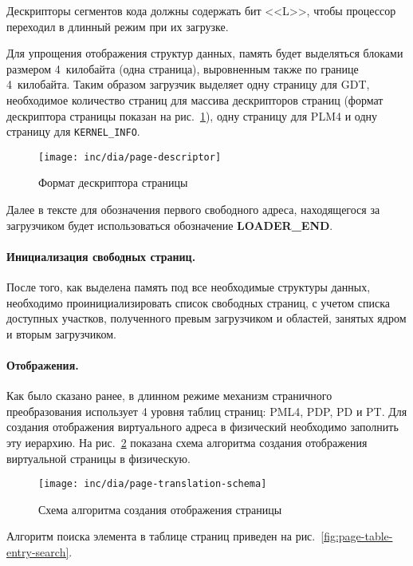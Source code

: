 Дескрипторы сегментов кода должны содержать бит <<L>>, чтобы процессор переходил в длинный
режим при их загрузке.

Для упрощения отображения структур данных, память будет выделяться блоками размером 4~килобайта (одна страница),
выровненным также по границе 4~килобайта. Таким образом загрузчик выделяет одну страницу для GDT, необходимое
количество страниц для массива дескрипторов страниц (формат дескриптора страницы показан на рис.~\ref{fig:page-descriptor}),
одну страницу для PLM4 и одну страницу для \texttt{KERNEL\_INFO}.

\begin{figure}[ht!]
  \centering
  \texttt{[image: inc/dia/page-descriptor]}
  \caption{Формат дескриптора страницы}
  \label{fig:page-descriptor}
\end{figure}

Далее в тексте для обозначения первого свободного адреса, находящегося за загрузчиком будет использоваться
обозначение \textbf{LOADER\_END}.


\paragraph{Инициализация свободных страниц.} После того, как выделена память под все
необходимые структуры данных, необходимо проинициализировать список свободных страниц,
с учетом списка доступных участков, полученного превым загрузчиком и областей,
занятых ядром и вторым загрузчиком.

\paragraph{Отображения.} Как было сказано ранее, в длинном режиме механизм страничного преобразования
использует 4 уровня таблиц страниц: PML4, PDP, PD и PT. Для создания отображения виртуального адреса
в физический необходимо заполнить эту иерархию. На рис.~\ref{fig:page-translation-schema} показана схема
алгоритма создания отображения виртуальной страницы в физическую.

\begin{figure}[ht!]
  \centering
  \texttt{[image: inc/dia/page-translation-schema]}
  \caption{Схема алгоритма создания отображения страницы}
  \label{fig:page-translation-schema}
\end{figure}

Алгоритм поиска элемента в таблице страниц приведен на рис.~\ref{fig:page-table-entry-search}.

